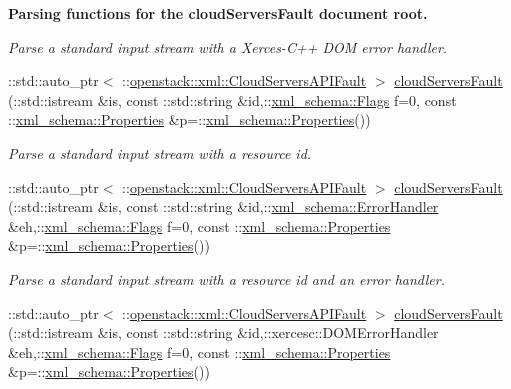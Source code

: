 \begin{Indent}{\bf Parsing functions for the cloudServersFault document root.}
\begin{DoxyCompactItemize}
\begin{DoxyCompactList}\small\item\em Parse a standard input stream with a Xerces-\/C++ DOM error handler. \item\end{DoxyCompactList}\item 
::std::auto\_\-ptr$<$ ::\hyperlink{classopenstack_1_1xml_1_1CloudServersAPIFault}{openstack::xml::CloudServersAPIFault} $>$ \hyperlink{namespaceopenstack_1_1xml_a0fa01481f3d9b02bc46c0fd0baed792f}{cloudServersFault} (::std::istream \&is, const ::std::string \&id,::\hyperlink{namespacexml__schema_affb4c227cbd9aa7453dd1dc5a1401943}{xml\_\-schema::Flags} f=0, const ::\hyperlink{namespacexml__schema_ad27ce19a7ee1d3b1064092648898f64c}{xml\_\-schema::Properties} \&p=::\hyperlink{namespacexml__schema_ad27ce19a7ee1d3b1064092648898f64c}{xml\_\-schema::Properties}())
\begin{DoxyCompactList}\small\item\em Parse a standard input stream with a resource id. \item\end{DoxyCompactList}\item 
::std::auto\_\-ptr$<$ ::\hyperlink{classopenstack_1_1xml_1_1CloudServersAPIFault}{openstack::xml::CloudServersAPIFault} $>$ \hyperlink{namespaceopenstack_1_1xml_af90b4713897d473db36cd7e3adc772d3}{cloudServersFault} (::std::istream \&is, const ::std::string \&id,::\hyperlink{namespacexml__schema_ab1c9361bfd3b404eaabf0c31eded79dc}{xml\_\-schema::ErrorHandler} \&eh,::\hyperlink{namespacexml__schema_affb4c227cbd9aa7453dd1dc5a1401943}{xml\_\-schema::Flags} f=0, const ::\hyperlink{namespacexml__schema_ad27ce19a7ee1d3b1064092648898f64c}{xml\_\-schema::Properties} \&p=::\hyperlink{namespacexml__schema_ad27ce19a7ee1d3b1064092648898f64c}{xml\_\-schema::Properties}())
\begin{DoxyCompactList}\small\item\em Parse a standard input stream with a resource id and an error handler. \item\end{DoxyCompactList}\item 
::std::auto\_\-ptr$<$ ::\hyperlink{classopenstack_1_1xml_1_1CloudServersAPIFault}{openstack::xml::CloudServersAPIFault} $>$ \hyperlink{namespaceopenstack_1_1xml_aa62d69c6c8beef4ba08b60edc290a276}{cloudServersFault} (::std::istream \&is, const ::std::string \&id,::xercesc::DOMErrorHandler \&eh,::\hyperlink{namespacexml__schema_affb4c227cbd9aa7453dd1dc5a1401943}{xml\_\-schema::Flags} f=0, const ::\hyperlink{namespacexml__schema_ad27ce19a7ee1d3b1064092648898f64c}{xml\_\-schema::Properties} \&p=::\hyperlink{namespacexml__schema_ad27ce19a7ee1d3b1064092648898f64c}{xml\_\-schema::Properties}())

\end{DoxyCompactItemize}
\end{Indent}
